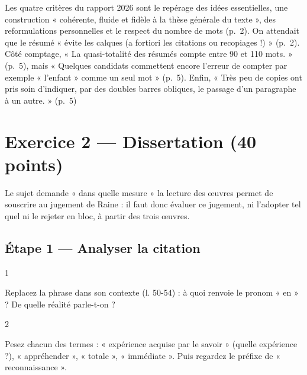 \documentclass[11pt,a4paper]{article}
\begin{document}
\begin{jury}

Les quatre critères du rapport 2026 sont le repérage des idées essentielles, une construction « cohérente, fluide et fidèle à la thèse générale du texte », des reformulations personnelles et le respect du nombre de mots (p.~2). On attendait que le résumé « évite les calques (a fortiori les citations ou recopiages !) » (p.~2). Côté comptage, « La quasi-totalité des résumés compte entre 90 et 110 mots. » (p.~5), mais « Quelques candidats commettent encore l'erreur de compter par exemple « l'enfant » comme un seul mot » (p.~5). Enfin, « Très peu de copies ont pris soin d'indiquer, par des doubles barres obliques, le passage d'un paragraphe à un autre. » (p.~5)

\end{jury}

\hypertarget{exercice-2-dissertation-40-points}{%
\section{Exercice 2 --- Dissertation (40 points)}\label{exercice-2-dissertation-40-points}}

Le sujet demande « dans quelle mesure » la lecture des œuvres permet de souscrire au jugement de Raine : il faut donc évaluer ce jugement, ni l'adopter tel quel ni le rejeter en bloc, à partir des trois œuvres.

\hypertarget{uxe9tape-1-analyser-la-citation}{%
\subsection{Étape 1 --- Analyser la citation}\label{uxe9tape-1-analyser-la-citation}}

\begin{indication}{1}

Replacez la phrase dans son contexte (l. 50-54) : à quoi renvoie le pronom « en » ? De quelle réalité parle-t-on ?

\end{indication}

\begin{indication}{2}

Pesez chacun des termes : « expérience acquise par le savoir » (quelle expérience ?), « appréhender », « totale », « immédiate ». Puis regardez le préfixe de « reconnaissance ».

\end{indication}
\end{document}

